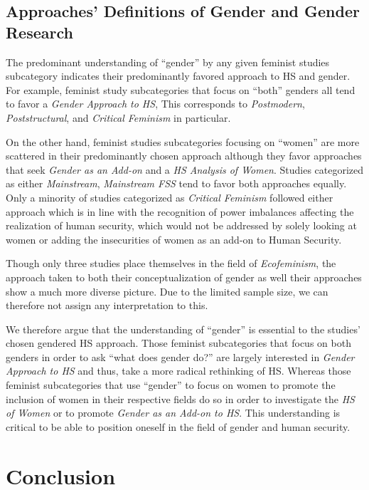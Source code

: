 \documentclass[10pt,a4paper]{article}
\begin{document}
\begin{multicols}{2}

\subsection{Approaches' Definitions of Gender and Gender Research}

\noindent The predominant understanding of ``gender'' by any given feminist studies subcategory indicates their predominantly favored approach to HS and gender. For example, feminist study subcategories that focus on ``both'' genders all tend to favor a \textit{Gender Approach to HS}, This corresponds to  \textit{Postmodern}, \textit{Poststructural}, and \textit{Critical Feminism} in particular. 

On the other hand, feminist studies subcategories focusing on ``women'' are more scattered in their predominantly chosen approach although they favor approaches that seek \textit{Gender as an Add-on} and a \textit{HS Analysis of Women}. Studies categorized as either \textit{Mainstream}, \textit{Mainstream FSS} tend to favor both approaches equally. Only a minority of studies categorized as \textit{Critical Feminism} followed either approach which is in line with the recognition of power imbalances affecting the realization of human security, which would not be addressed by solely looking at women or adding the insecurities of women as an add-on to Human Security.

Though only three studies place themselves in the field of \textit{Ecofeminism}, the approach taken to both their conceptualization of gender as well their approaches show a much more diverse picture. Due to the limited sample size, we can therefore not assign any interpretation to this.

We therefore argue that the understanding of ``gender'' is essential to the studies' chosen gendered HS approach. Those feminist subcategories that focus on both genders in order to ask ``what does gender do?'' are largely interested in \textit{Gender Approach to HS} and thus, take a more radical rethinking of HS. Whereas those feminist subcategories that use ``gender'' to focus on women to promote the inclusion of women in their respective fields do so in order to investigate the \textit{HS of Women} or to promote \textit{Gender as an Add-on to HS}. This understanding is critical to be able to position oneself in the field of gender and human security.

\section{Conclusion}


\end{multicols}
\end{document}
